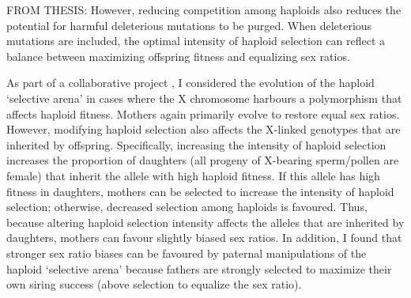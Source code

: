 \documentclass[12pt]{article}
\begin{document}
{\color{blue}
FROM THESIS:
However, reducing competition among haploids also reduces the potential for harmful deleterious mutations to be purged. 
When deleterious mutations are included, the optimal intensity of haploid selection can reflect a balance between maximizing offspring fitness and equalizing sex ratios. 

As part of a collaborative project \citep{Otto:2015va}, I considered the evolution of the haploid `selective arena' in cases where the X chromosome harbours a polymorphism that affects haploid fitness. 
Mothers again primarily evolve to restore equal sex ratios.
However, modifying haploid selection also affects the X-linked genotypes that are inherited by offspring. 
Specifically, increasing the intensity of haploid selection increases the proportion of daughters (all progeny of X-bearing sperm/pollen are female) that inherit the allele with high haploid fitness. 
If this allele has high fitness in daughters, mothers can be selected to increase the intensity of haploid selection; otherwise, decreased selection among haploids is favoured.
Thus, because altering haploid selection intensity affects the alleles that are inherited by daughters, mothers can favour slightly biased sex ratios. 
In addition, I found that stronger sex ratio biases can be favoured by paternal manipulations of the haploid `selective arena' because fathers are strongly selected to maximize their own siring success (above selection to equalize the sex ratio).

}
\end{document}
